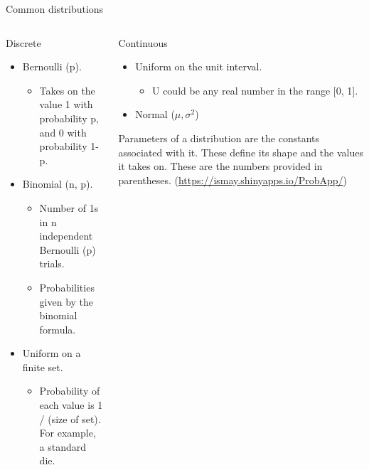 \documentclass[aspectratio=169]{../latex_main/tntbeamer}  %
\begin{document}
	
	\begin{frame}[c]{Common distributions}
	   \begin{columns}
	        \begin{column}{.4\textwidth}
	             Discrete
	             \begin{itemize}
	                 \item Bernoulli (p).
	                 \begin{itemize}
	                     \item Takes on the value 1 with probability p, and 0 with probability 1-p.
	                 \end{itemize}
	                 \item Binomial (n, p).
	                 \begin{itemize}
	                     \item Number of 1s in n independent Bernoulli (p) trials.
	                     \item Probabilities given by the binomial formula.
	                 \end{itemize}
	                 \item Uniform on a finite set.
	                 \begin{itemize}
	                     \item Probability of each value is 1 / (size of set). For example, a standard die.
	                 \end{itemize}
	             \end{itemize}
	        \end{column}
	        
	        \begin{column}{.4\textwidth}
	         Continuous
	         \begin{itemize}
	             \item Uniform on the unit interval.
	             \begin{itemize}
	                 \item U could be any real number in the range [0, 1]. 
	             \end{itemize}
	             \item Normal ($\mu,\sigma^2$)
	         \end{itemize}
	         Parameters of a distribution are the constants associated with it. These define its shape and the values it takes on. These are the numbers provided in parentheses. (\url{https://ismay.shinyapps.io/ProbApp/})


	        \end{column}
	    \end{columns}

	\end{frame}
	
\end{document}
